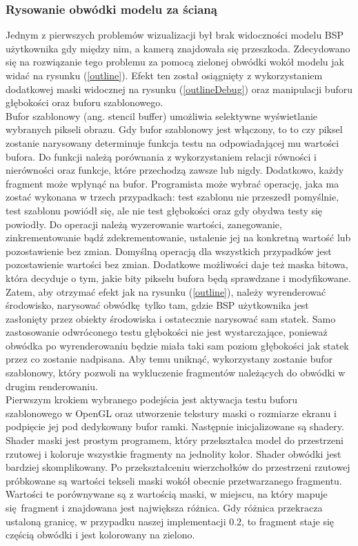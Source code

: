 \subsubsection{Rysowanie obwódki modelu za ścianą}

Jednym z pierwszych problemów wizualizacji był brak widoczności modelu BSP użytkownika gdy między nim, a kamerą znajdowała się przeszkoda. Zdecydowano się na rozwiązanie tego problemu za pomocą zielonej obwódki wokół modelu jak widać na rysunku (\ref{outline}). Efekt ten został osiągnięty z wykorzystaniem dodatkowej maski widocznej na rysunku (\ref{outlineDebug}) oraz manipulacji buforu głębokości oraz buforu szablonowego.
\\

Bufor szablonowy (ang. stencil buffer) umożliwia selektywne wyświetlanie wybranych pikseli obrazu. Gdy bufor szablonowy jest włączony, to to czy piksel zostanie narysowany determinuje funkcja testu na odpowiadającej mu wartości bufora. Do funkcji należą porównania z wykorzystaniem relacji równości i nierówności oraz funkcje, które przechodzą zawsze lub nigdy.
Dodatkowo, każdy fragment może wpłynąć na bufor. Programista może wybrać operację, jaka ma zostać wykonana w trzech przypadkach: test szablonu nie przeszedł pomyślnie, test szablonu powiódł się, ale nie test głębokości oraz gdy obydwa testy się powiodły. Do operacji należą wyzerowanie wartości, zanegowanie, zinkrementowanie bądź zdekrementowanie, ustalenie jej na konkretną wartość lub pozostawienie bez zmian. Domyślną operacją dla wszystkich przypadków jest pozostawienie wartości bez zmian. Dodatkowe możliwości daje też maska bitowa, która decyduje o tym, jakie bity pikselu bufora będą sprawdzane i modyfikowane. 
\\

Zatem, aby otrzymać efekt jak na rysunku (\ref{outline}), należy wyrenderować środowisko, narysować obwódkę tylko tam, gdzie BSP użytkownika jest zasłonięty przez obiekty środowiska i ostatecznie narysować sam statek. Samo zastosowanie odwróconego testu głębokości nie jest wystarczające, ponieważ obwódka po wyrenderowaniu będzie miała taki sam poziom głębokości jak statek przez co zostanie nadpisana. Aby temu uniknąć, wykorzystany zostanie bufor szablonowy, który pozwoli na wykluczenie fragmentów należących do obwódki w drugim renderowaniu.
\\

Pierwszym krokiem wybranego podejścia jest aktywacja testu buforu szablonowego w OpenGL oraz utworzenie tekstury maski o rozmiarze ekranu i podpięcie jej pod dedykowany bufor ramki. Następnie inicjalizowane są shadery. Shader maski jest prostym programem, który przekształca model do przestrzeni rzutowej i koloruje wszystkie fragmenty na jednolity kolor. Shader obwódki jest bardziej skomplikowany. Po przekształceniu wierzchołków do przestrzeni rzutowej próbkowane są wartości tekseli maski wokół obecnie przetwarzanego fragmentu. Wartości te porównywane są z wartością maski, w miejscu, na który mapuje się fragment i znajdowana jest największa różnica. Gdy różnica przekracza ustaloną granicę, w przypadku naszej implementacji $0.2$, to fragment staje się częścią obwódki i jest kolorowany na zielono.
\\

